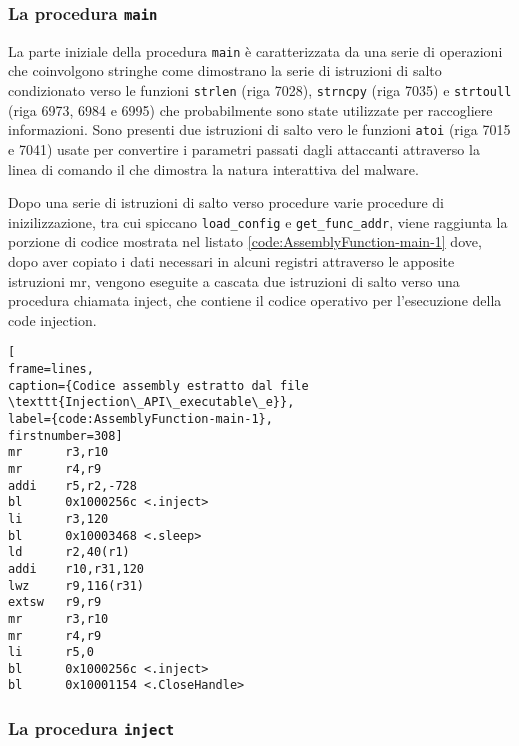 \documentclass[10pt,a4paper, titlepage]{report}
\begin{document}
\subsubsection{La procedura \texttt{main}} 

La parte iniziale della procedura \texttt{main} è caratterizzata da una serie di operazioni che coinvolgono stringhe come dimostrano la serie di istruzioni di salto condizionato verso le funzioni \texttt{strlen} (riga 7028), \texttt{strncpy} (riga 7035) e \texttt{strtoull} (riga 6973, 6984 e 6995) che probabilmente sono state utilizzate per raccogliere informazioni. Sono presenti due istruzioni di salto vero le funzioni \texttt{atoi} (riga 7015 e 7041) usate per convertire i parametri passati dagli attaccanti attraverso la linea di comando il che dimostra la natura interattiva del malware.

Dopo una serie di istruzioni di salto verso procedure varie procedure di inizilizzazione, tra cui spiccano \texttt{load\_config} e \texttt{get\_func\_addr}, viene raggiunta la porzione di codice mostrata nel listato \ref{code:AssemblyFunction-main-1} dove, dopo aver copiato i dati necessari in alcuni registri attraverso le apposite istruzioni mr, vengono eseguite a cascata due istruzioni di salto verso una procedura chiamata inject, che contiene il codice operativo per l'esecuzione della code injection. 

\begin{lstlisting}[
frame=lines, 
caption={Codice assembly estratto dal file \texttt{Injection\_API\_executable\_e}}, 
label={code:AssemblyFunction-main-1},
firstnumber=308]
mr      r3,r10
mr      r4,r9
addi    r5,r2,-728
bl      0x1000256c <.inject>
li      r3,120
bl      0x10003468 <.sleep>
ld      r2,40(r1)
addi    r10,r31,120
lwz     r9,116(r31)
extsw   r9,r9
mr      r3,r10
mr      r4,r9
li      r5,0
bl      0x1000256c <.inject>
bl      0x10001154 <.CloseHandle>
\end{lstlisting}



\subsubsection{La procedura \texttt{inject}}
\end{document}

